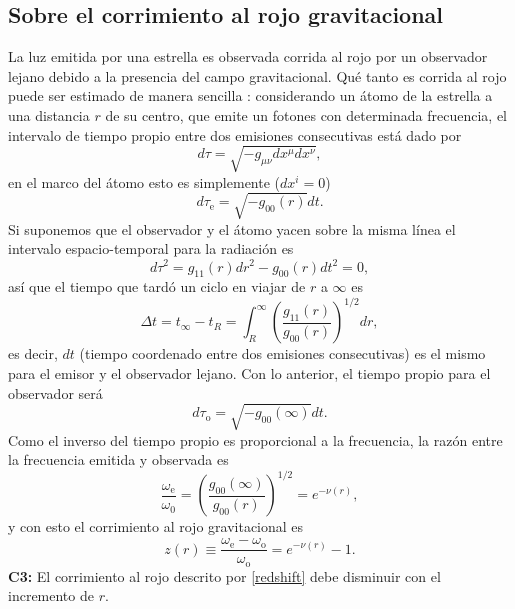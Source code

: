 \subsection*{ Sobre el corrimiento al rojo gravitacional}
La luz emitida por una estrella es observada corrida al rojo por un observador lejano debido a la presencia del campo gravitacional. Qué tanto es corrida al rojo puede ser estimado de manera sencilla \cite{Glendenning2000}: considerando un átomo de la estrella a una distancia $r$ de su centro, que emite un fotones con determinada frecuencia, el intervalo de tiempo propio entre dos emisiones consecutivas está dado por
\begin{equation}
d \tau=\sqrt{-g_{\mu \nu} d x^{\mu} d x^{\nu}},
\end{equation}
en el marco del átomo esto es simplemente ($dx^i=0$)
\begin{equation}
d \tau_{\mathrm{e}}=\sqrt{-g_{00}(r)} d t.
\end{equation}
Si suponemos que el observador y el átomo yacen sobre la misma línea el intervalo espacio-temporal para la radiación es
\begin{equation}
d \tau^{2}=g_{11}(r) d r^{2} - g_{00}(r) d t^{2} = 0,
\end{equation}
así que el tiempo que tardó un ciclo en viajar de $r$ a $\infty$ es
\begin{equation}
\Delta t=t_{\infty}-t_{R}=\int_{R}^{\infty}\left(\frac{g_{11}(r)}{g_{00}(r)}\right)^{1 / 2} d r,
\end{equation}
es decir, $dt$ (tiempo coordenado entre dos emisiones consecutivas) es el mismo para el emisor y el observador lejano. Con lo anterior, el tiempo propio para el observador será
\begin{equation}
d \tau_{\mathrm{o}}=\sqrt{-g_{00}(\infty)} d t.
\end{equation}
Como el inverso del tiempo propio es proporcional a la frecuencia, la razón entre la frecuencia emitida y observada es
\begin{equation}
\frac{\omega_{\mathrm{e}}}{\omega_{\mathrm{0}}}=\left(\frac{g_{00}(\infty)}{g_{00}(r)}\right)^{1 / 2}=e^{-\nu(r)},
\end{equation}
y con esto el corrimiento al rojo gravitacional es
\begin{equation}
    z(r)\equiv \frac{\omega_{\mathrm{e}}-\omega_{\mathrm{o}}}{\omega_{\mathrm{o}}}  = e^{-\nu(r)}-1.
    \label{redshift}
\end{equation}
\textbf{C3:} El corrimiento al rojo descrito por \eqref{redshift} debe disminuir con el incremento de $r$.
